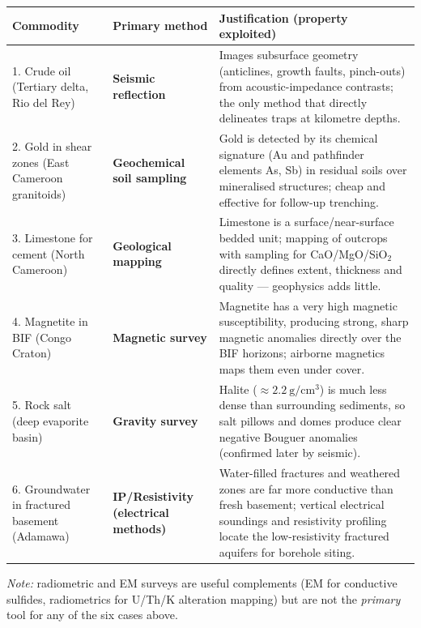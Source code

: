 \documentclass[11pt]{article}
\begin{document}
\begin{corrige}
\begin{center}
\begin{tabularx}{\linewidth}{|l|l|X|}\hline
\rowcolor{popblueL} Commodity & Primary method & Justification (property exploited) \\ \hline
1. Crude oil (Tertiary delta, Rio del Rey) & \textbf{Seismic reflection} & Images subsurface geometry (anticlines, growth faults, pinch-outs) from acoustic-impedance contrasts; the only method that directly delineates traps at kilometre depths. \\ \hline
2. Gold in shear zones (East Cameroon granitoids) & \textbf{Geochemical soil sampling} & Gold is detected by its chemical signature (Au and pathfinder elements As, Sb) in residual soils over mineralised structures; cheap and effective for follow-up trenching. \\ \hline
3. Limestone for cement (North Cameroon) & \textbf{Geological mapping} & Limestone is a surface/near-surface bedded unit; mapping of outcrops with sampling for CaO/MgO/SiO$_2$ directly defines extent, thickness and quality --- geophysics adds little. \\ \hline
4. Magnetite in BIF (Congo Craton) & \textbf{Magnetic survey} & Magnetite has a very high magnetic susceptibility, producing strong, sharp magnetic anomalies directly over the BIF horizons; airborne magnetics maps them even under cover. \\ \hline
5. Rock salt (deep evaporite basin) & \textbf{Gravity survey} & Halite ($\approx 2.2\ \mathrm{g/cm^3}$) is much less dense than surrounding sediments, so salt pillows and domes produce clear negative Bouguer anomalies (confirmed later by seismic). \\ \hline
6. Groundwater in fractured basement (Adamawa) & \textbf{IP/Resistivity (electrical methods)} & Water-filled fractures and weathered zones are far more conductive than fresh basement; vertical electrical soundings and resistivity profiling locate the low-resistivity fractured aquifers for borehole siting. \\ \hline
\end{tabularx}
\end{center}
\emph{Note:} radiometric and EM surveys are useful complements (EM for conductive sulfides, radiometrics for U/Th/K alteration mapping) but are not the \emph{primary} tool for any of the six cases above.
\end{corrige}
\end{document}
